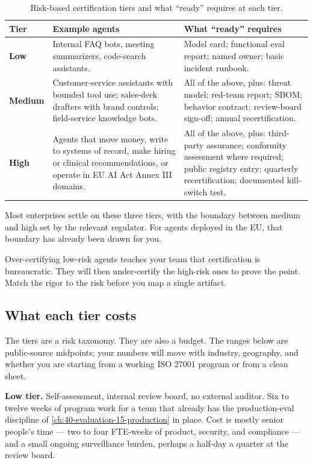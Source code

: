 \begin{table}[ht]
\centering
\caption{Risk-based certification tiers and what ``ready'' requires at each tier.}
\small
\begin{tabularx}{\textwidth}{@{}l X X@{}}
\toprule
\textbf{Tier} & \textbf{Example agents} & \textbf{What ``ready'' requires} \\
\midrule
\textbf{Low} & Internal FAQ bots, meeting summarizers, code-search assistants. & Model card; functional eval report; named owner; basic incident runbook. \\
\addlinespace
\textbf{Medium} & Customer-service assistants with bounded tool use; sales-deck drafters with brand controls; field-service knowledge bots. & All of the above, plus: threat model; red-team report; SBOM; behavior contract; review-board sign-off; annual recertification. \\
\addlinespace
\textbf{High} & Agents that move money, write to systems of record, make hiring or clinical recommendations, or operate in EU AI Act Annex III domains. & All of the above, plus: third-party assurance; conformity assessment where required; public registry entry; quarterly recertification; documented kill-switch test. \\
\bottomrule
\end{tabularx}
\end{table}

Most enterprises settle on these three tiers, with the boundary between medium and high set by the relevant regulator. For agents deployed in the EU, that boundary has already been drawn for you.

\begin{TNwarning} Over-certifying low-risk agents teaches your team that certification is bureaucratic. They will then under-certify the high-risk ones to prove the point. Match the rigor to the risk before you map a single artifact. \end{TNwarning}

\subsection*{What each tier costs}

The tiers are a risk taxonomy. They are also a budget. The ranges below are public-source midpoints; your numbers will move with industry, geography, and whether you are starting from a working ISO 27001 program or from a clean sheet.

\textbf{Low tier.} Self-assessment, internal review board, no external auditor. Six to twelve weeks of program work for a team that already has the production-eval discipline of \autoref{ch:40-evaluation-15-production} in place. Cost is mostly senior people's time --- two to four FTE-weeks of product, security, and compliance --- and a small ongoing surveillance burden, perhaps a half-day a quarter at the review board.

